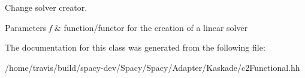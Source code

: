 \-Change solver creator. 


\begin{DoxyParams}{\-Parameters}
{\em f} & function/functor for the creation of a linear solver \\
\hline
\end{DoxyParams}


\-The documentation for this class was generated from the following file\-:\begin{DoxyCompactItemize}
\item 
/home/travis/build/spacy-\/dev/\-Spacy/\-Spacy/\-Adapter/\-Kaskade/c2\-Functional.\-hh\end{DoxyCompactItemize}
